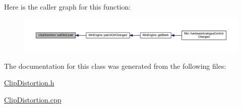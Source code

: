 Here is the caller graph for this function\+:
\nopagebreak
\begin{figure}[H]
\begin{center}
\leavevmode
\includegraphics[width=350pt]{d8/da2/class_clip_distortion_a1fe19163beb22de83c8adff0e6447bc8_icgraph}
\end{center}
\end{figure}


The documentation for this class was generated from the following files\+:\begin{DoxyCompactItemize}
\item 
\hyperlink{_clip_distortion_8h}{Clip\+Distortion.\+h}\item 
\hyperlink{_clip_distortion_8cpp}{Clip\+Distortion.\+cpp}\end{DoxyCompactItemize}
